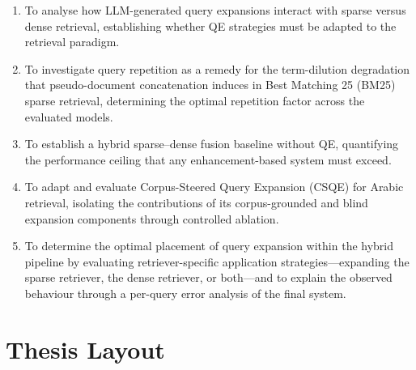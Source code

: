 \begin{enumerate}[label=\roman*.]
    \item To analyse how LLM-generated query expansions interact with sparse versus dense retrieval, establishing whether QE strategies must be adapted to the retrieval paradigm.

    \item To investigate query repetition as a remedy for the term-dilution degradation that pseudo-document concatenation induces in Best Matching 25 (BM25) sparse retrieval, determining the optimal repetition factor across the evaluated models.

    \item To establish a hybrid sparse--dense fusion baseline without QE, quantifying the performance ceiling that any enhancement-based system must exceed.

    \item To adapt and evaluate Corpus-Steered Query Expansion (CSQE) for Arabic retrieval, isolating the contributions of its corpus-grounded and blind expansion components through controlled ablation.

    \item To determine the optimal placement of query expansion within the hybrid pipeline by evaluating retriever-specific application strategies---expanding the sparse retriever, the dense retriever, or both---and to explain the observed behaviour through a per-query error analysis of the final system.
\end{enumerate}

\section{Thesis Layout}
\label{sec:thesis_layout}

